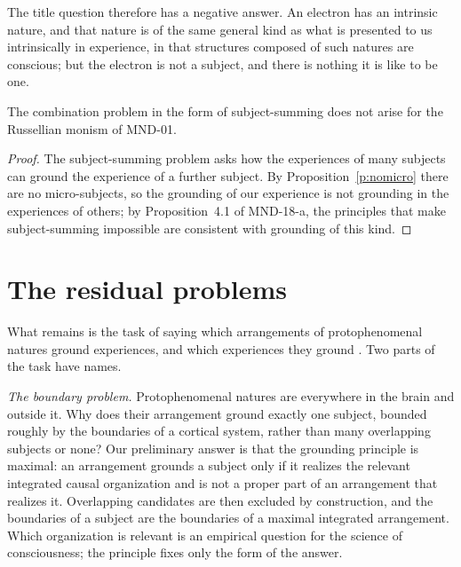 \documentclass{situationist-preprint}
\begin{document}
The title question therefore has a negative answer. An electron has an intrinsic nature, and that nature is of the same general kind as what is presented to us intrinsically in experience, in that structures composed of such natures are conscious; but the electron is not a subject, and there is nothing it is like to be one.

\begin{corollary}\label{c:nosum}
The combination problem in the form of subject-summing does not arise for the Russellian monism of MND-01.
\end{corollary}

\begin{proof}
The subject-summing problem asks how the experiences of many subjects can ground the experience of a further subject. By Proposition~\ref{p:nomicro} there are no micro-subjects, so the grounding of our experience is not grounding in the experiences of others; by Proposition~4.1 of MND-18-a, the principles that make subject-summing impossible are consistent with grounding of this kind.
\end{proof}

\section{The residual problems}\label{s:residual}

What remains is the task of saying which arrangements of protophenomenal natures ground experiences, and which experiences they ground \citep{Chalmers2017}. Two parts of the task have names.

\emph{The boundary problem.} Protophenomenal natures are everywhere in the brain and outside it. Why does their arrangement ground exactly one subject, bounded roughly by the boundaries of a cortical system, rather than many overlapping subjects or none? Our preliminary answer is that the grounding principle is maximal: an arrangement grounds a subject only if it realizes the relevant integrated causal organization and is not a proper part of an arrangement that realizes it. Overlapping candidates are then excluded by construction, and the boundaries of a subject are the boundaries of a maximal integrated arrangement. Which organization is relevant is an empirical question for the science of consciousness; the principle fixes only the form of the answer.
\end{document}

